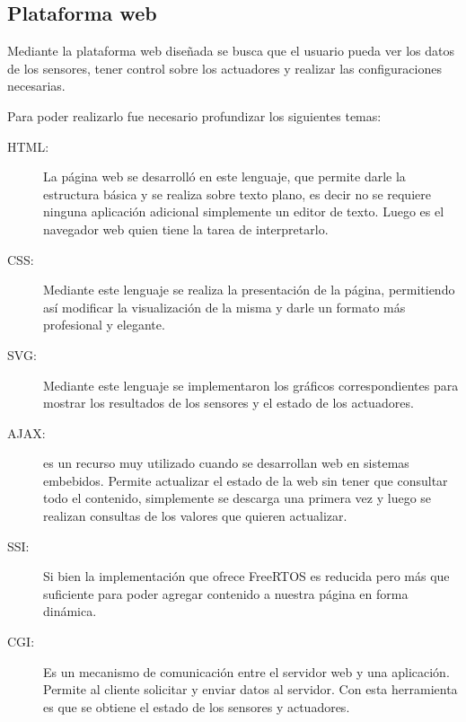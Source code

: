 \subsection{ Plataforma web}
Mediante la plataforma web diseñada se busca que el usuario pueda ver los datos de los sensores, tener control sobre los actuadores y realizar las configuraciones necesarias. 

Para poder realizarlo fue necesario profundizar los siguientes temas:
\begin{description}
  \item[HTML:] La página web se desarrolló en este lenguaje, que permite darle la estructura básica y se realiza sobre texto plano, es decir no se requiere ninguna aplicación adicional simplemente un editor de texto. Luego es el navegador web quien tiene la tarea de interpretarlo. 
  \item[CSS:] Mediante este lenguaje se realiza la presentación de la página, permitiendo así modificar la visualización de la misma y darle un formato más profesional y elegante.
  \item[SVG:] Mediante este lenguaje se implementaron los gráficos correspondientes para mostrar los resultados de los sensores y el estado de los actuadores.
  \item[AJAX:] es un recurso muy utilizado cuando se desarrollan web en sistemas embebidos. Permite actualizar el estado de la web sin tener que consultar todo el contenido, simplemente se descarga una primera vez y luego se realizan consultas de los valores que quieren actualizar. 
  \item[SSI:] Si bien la implementación que ofrece FreeRTOS es reducida pero más que suficiente para poder agregar contenido a nuestra página en forma dinámica.
  \item[CGI:] Es un mecanismo de comunicación entre el servidor web y una aplicación. Permite al cliente solicitar y enviar datos al servidor. Con esta herramienta es que se obtiene el estado de los sensores y actuadores.
\end{description}

